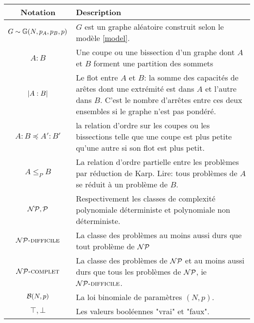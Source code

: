 \documentclass{standalone}
\begin{document}
	\centering
\begin{tabularx}{\textwidth}{|c|X|}
	\hline
	Notation & Description \\
	\hline
	$G \sim \mathbb G(N, p_A, p_B, p)$ & $G$ est un graphe aléatoire construit selon le modèle \ref{model}.  \\
	\hline
	$A:B$ & Une coupe ou une bissection d'un graphe dont $A$ et $B$ forment une partition des sommets \\
	\hline
	$\left| A:B\right|$ & Le flot entre $A$ et $B$: la somme des capacités de arêtes dont une extrémité est dans $A$ et l'autre dans $B$. C'est le nombre d'arrêtes entre ces deux ensembles si le graphe n'est pas pondéré. \\
		\hline
	$A:B \preceq A':B'$ & la relation d'ordre sur les coupes ou les bissections telle que une coupe est plus petite qu'une autre si son flot est plus petit. \\
		\hline
	$A \leq_P B$ & La relation d'ordre partielle entre les problèmes par réduction de Karp\cite{21karp}. Lire: tous problèmes de $A$ se réduit à un problème de $B$. \\
		\hline
	$\mathcal{NP}, \mathcal{P}$ & Respectivement les classes de complexité polynomiale déterministe et polynomiale non déterministe. \\
		\hline
	$\mathcal{NP}\text{\textsc{-difficile}}$ & La classe des problèmes au moins aussi durs que tout problème de $\mathcal{NP}$ \\
		\hline
	$\mathcal{NP}\text{\textsc{-complet}}$ & La classe des problèmes de $\mathcal{NP}$ et au moins aussi durs que tous les problèmes de $\mathcal{NP}$, ie $\mathcal{NP}\text{\textsc{-difficile}}$. \\
	\hline
	$\mathcal B(N, p)$ & La loi binomiale de paramètres $(N,p)$. \\
		\hline
	$\top, \bot$ & Les valeurs booléennes "vrai" et "faux". 
		\\
		\hline
\end{tabularx}
\end{document}
